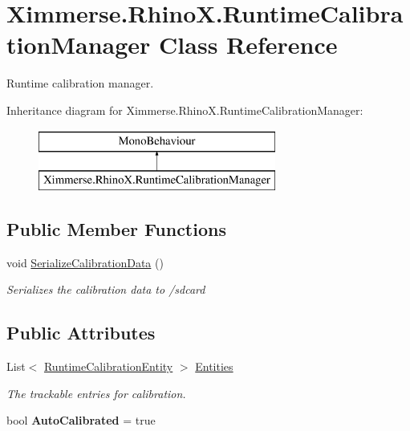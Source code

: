 \hypertarget{class_ximmerse_1_1_rhino_x_1_1_runtime_calibration_manager}{}\section{Ximmerse.\+Rhino\+X.\+Runtime\+Calibration\+Manager Class Reference}
\label{class_ximmerse_1_1_rhino_x_1_1_runtime_calibration_manager}


Runtime calibration manager.  


Inheritance diagram for Ximmerse.\+Rhino\+X.\+Runtime\+Calibration\+Manager\+:\begin{figure}[H]
\begin{center}
\leavevmode
\includegraphics[height=2.000000cm]{class_ximmerse_1_1_rhino_x_1_1_runtime_calibration_manager}
\end{center}
\end{figure}
\subsection*{Public Member Functions}
\begin{DoxyCompactItemize}
\item 
void \mbox{\hyperlink{class_ximmerse_1_1_rhino_x_1_1_runtime_calibration_manager_a2eed7edd69a12c8ff0d3f8b4feb60f49}{Serialize\+Calibration\+Data}} ()
\begin{DoxyCompactList}\small\item\em Serializes the calibration data to /sdcard \end{DoxyCompactList}\end{DoxyCompactItemize}
\subsection*{Public Attributes}
\begin{DoxyCompactItemize}
\item 
List$<$ \mbox{\hyperlink{class_ximmerse_1_1_rhino_x_1_1_runtime_calibration_entity}{Runtime\+Calibration\+Entity}} $>$ \mbox{\hyperlink{class_ximmerse_1_1_rhino_x_1_1_runtime_calibration_manager_abf1b09b36bf1e6bccca57a451a263376}{Entities}}
\begin{DoxyCompactList}\small\item\em The trackable entries for calibration. \end{DoxyCompactList}\item 
\mbox{\label{class_ximmerse_1_1_rhino_x_1_1_runtime_calibration_manager_abad22a1c28c38677a99cf817f4612595}} 
bool {\bfseries Auto\+Calibrated} = true
\end{DoxyCompactItemize}
